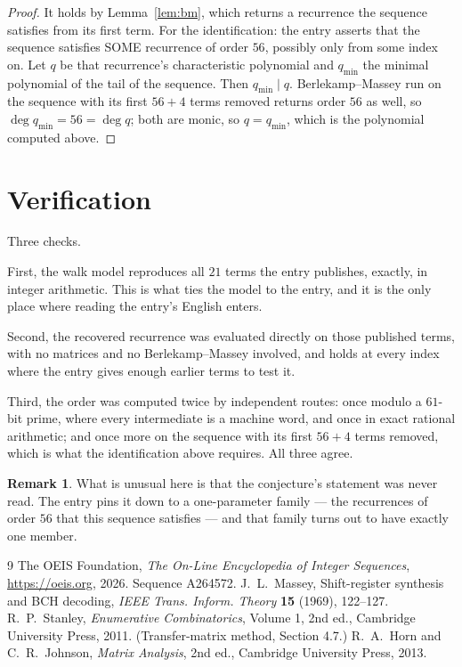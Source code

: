 \documentclass[11pt,a4paper]{article}
\theoremstyle{plain}
\theoremstyle{definition}
\newtheorem{remark}[theorem]{Remark}
\begin{document}
\begin{proof}
It holds by Lemma~\ref{lem:bm}, which returns a recurrence the sequence satisfies from its
first term. For the identification: the entry asserts that the sequence satisfies SOME
recurrence of order $56$, possibly only from some index on. Let $q$ be that recurrence's
characteristic polynomial and $q_{\min}$ the minimal polynomial of the tail of the sequence.
Then $q_{\min}\mid q$. Berlekamp--Massey run on the sequence with its first $56+4$ terms
removed returns order $56$ as well, so $\deg q_{\min}=56=\deg q$; both are monic, so
$q=q_{\min}$, which is the polynomial computed above.
\end{proof}

\section{Verification}

Three checks.

First, the walk model reproduces all $21$ terms the entry publishes, exactly, in integer
arithmetic. This is what ties the model to the entry, and it is the only place where reading
the entry's English enters.

Second, the recovered recurrence was evaluated directly on those published terms, with no
matrices and no Berlekamp--Massey involved, and holds at every index where the entry gives
enough earlier terms to test it.

Third, the order was computed twice by independent routes: once modulo a $61$-bit prime, where
every intermediate is a machine word, and once in exact rational arithmetic; and once more on
the sequence with its first $56+4$ terms removed, which is what the identification above
requires. All three agree.

\begin{remark}
What is unusual here is that the conjecture's statement was never read. The entry pins it down
to a one-parameter family --- the recurrences of order $56$ that this sequence satisfies
--- and that family turns out to have exactly one member.
\end{remark}

\begin{thebibliography}{9}
 The OEIS Foundation, \emph{The On-Line Encyclopedia of Integer
Sequences}, \url{https://oeis.org}, 2026. Sequence A264572.
 J.~L.~Massey, Shift-register synthesis and BCH decoding, \emph{IEEE
Trans. Inform. Theory} \textbf{15} (1969), 122--127.
 R.~P.~Stanley, \emph{Enumerative Combinatorics}, Volume 1, 2nd ed.,
Cambridge University Press, 2011. (Transfer-matrix method, Section 4.7.)
 R.~A.~Horn and C.~R.~Johnson, \emph{Matrix Analysis}, 2nd ed., Cambridge
University Press, 2013.
\end{thebibliography}
\end{document}
